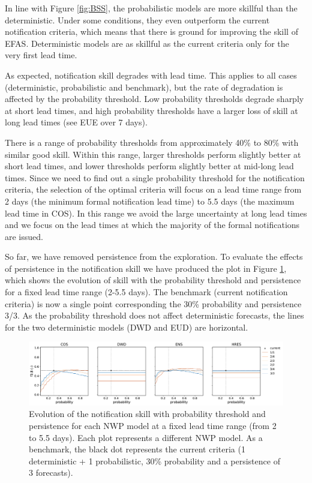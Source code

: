 \documentclass[preprint,12pt]{elsarticle}
\begin{document}
In line with Figure \ref{fig:BSS}, the probabilistic models are more skillful than the deterministic. Under some conditions, they even outperform the current notification criteria, which means that there is ground for improving the skill of EFAS. Deterministic models are as skillful as the current criteria only for the very first lead time.

As expected, notification skill degrades with lead time. This applies to all cases (deterministic, probabilistic and benchmark), but the rate of degradation is affected by the probability threshold. Low probability thresholds degrade sharply at short lead times, and high probability thresholds have a larger loss of skill at long lead times (see EUE over 7 days). 

There is a range of probability thresholds from approximately 40\% to 80\% with similar good skill. Within this range, larger thresholds perform slightly better at short lead times, and lower thresholds perform slightly better at mid-long lead times. Since we need to find out a single probability threshold for the notification criteria, the selection of the optimal criteria will focus on a lead time range from 2 days (the minimum formal notification lead time) to 5.5 days (the maximum lead time in COS). In this range we avoid the large uncertainty at long lead times and we focus on the lead times at which the majority of the formal notifications are issued.

So far, we have removed persistence from the exploration. To evaluate the effects of persistence in the notification skill we have produced the plot in Figure \ref{fig:NWP_skill_probability}, which shows the evolution of skill with the probability threshold and persistence for a fixed lead time range (2-5.5 days). The benchmark (current notification criteria) is now a single point corresponding the 30\% probability and persistence 3/3. As the probability threshold does not affect deterministic forecasts, the lines for the two deterministic models (DWD and EUD) are horizontal.

\begin{figure}
    \centering
    \includegraphics[width=1\textwidth]{figures/skill_persistence_probability_060h_NWP.pdf}
    \caption{Evolution of the notification skill with probability threshold and persistence  for each NWP model at a fixed lead time range (from 2 to 5.5 days). Each plot represents a different NWP model. As a benchmark, the black dot represents the current criteria (1 deterministic + 1 probabilistic, 30\% probability and a persistence of 3 forecasts).}
    \label{fig:NWP_skill_probability}
\end{figure}
\end{document}
